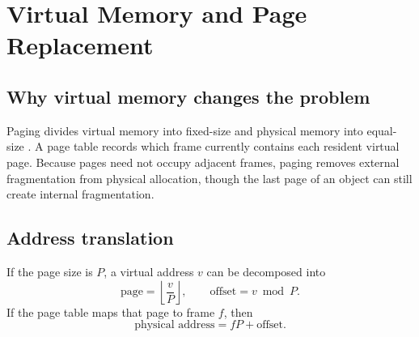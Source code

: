 \chapter{Virtual Memory and Page Replacement}\label{ch:vm}

\section{Why virtual memory changes the problem}
Paging divides virtual memory into fixed-size  and physical memory into equal-size . A page table records which frame currently contains each resident virtual page. Because pages need not occupy adjacent frames, paging removes external fragmentation from physical allocation, though the last page of an object can still create internal fragmentation.

\section{Address translation}
If the page size is $P$, a virtual address $v$ can be decomposed into
\[
\text{page} = \left\lfloor \frac{v}{P}\right\rfloor, \qquad
\text{offset} = v \bmod P.
\]
If the page table maps that page to frame $f$, then
\[
\text{physical address} = fP + \text{offset}.
\]

